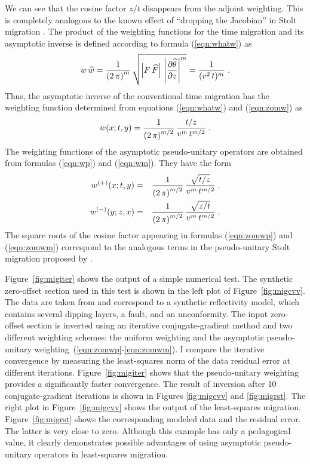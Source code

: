 We can see that the cosine factor $z/t$ disappears from the adjoint
weighting. This is completely analogous to the known effect of
``dropping the Jacobian'' in Stolt migration
\cite[]{Harlan.sep.35.181,Levin.sep.80.513}.  The product of the
weighting functions for the time migration and its asymptotic inverse
is defined according to formula (\ref{eqn:whatw}) as
\begin{equation}
w\,\widehat{w}={1\over{\left(2\,\pi\right)^m}} \, 
{\sqrt{\left|F\,\widehat{F}\right|\,
\left|\partial \widehat{\theta} \over \partial z\right|^m}} =
{1 \over {(v^2\,t)^m}}\;.
\label{eqn:zomww}
\end{equation}
Thus, the asymptotic inverse of the conventional time migration has
the weighting function determined from equations (\ref{eqn:whatw}) and
(\ref{eqn:zomw}) as
\begin{equation}
w(x;t,y) = {1\over{\left(2\,\pi\right)^{m/2}}} \, {{t/z} \over
{v^m\,t^{m/2}}}\;.
\label{eqn:invzomw}
\end{equation}
The weighting functions of the asymptotic pseudo-unitary operators are
obtained from formulas (\ref{eqn:wp}) and (\ref{eqn:wm}). They have the form
 \begin{eqnarray} 
w^{(+)}(x;t,y) & = &
{1\over{\left(2\,\pi\right)^{m/2}}} \, 
{\sqrt{t/z} \over {v^m\,t^{m/2}}}\;.
\label{eqn:zomwp} \\
w^{(-)}(y;z,x) & = & {1\over{\left(2\,\pi\right)^{m/2}}} \, 
{\sqrt{z/t} \over {v^m\,t^{m/2}}}\;.
\label{eqn:zomwm}
\end{eqnarray}
The square roots of the cosine factor appearing in formulas
(\ref{eqn:zomwp}) and (\ref{eqn:zomwm}) correspond to the analogous
terms in the pseudo-unitary Stolt migration proposed by
\cite{Harlan.sep.48.127}.

Figure~\ref{fig:migiter} shows the output of a simple numerical test.
The synthetic zero-offset section used in this test is shown in the
left plot of Figure~\ref{fig:migcvv}. The data are taken from
\cite{Claerbout.bei.95} and correspond to a synthetic reflectivity
model, which contains several dipping layers, a fault, and an
unconformity. The input zero-offset section is inverted using an
iterative conjugate-gradient method and two different weighting
schemes: the uniform weighting and the asymptotic pseudo-unitary
weighting~(\ref{eqn:zomwp}-\ref{eqn:zomwm}). I compare the iterative
convergence by measuring the least-squares norm of the data residual
error at different iterations.  Figure~\ref{fig:migiter} shows that
the pseudo-unitary weighting provides a significantly faster
convergence.  The result of inversion after 10 conjugate-gradient
iterations is shown in Figures \ref{fig:migcvv} and \ref{fig:migrst}.
The right plot in Figure~\ref{fig:migcvv} shows the output of the
least-squares migration. Figure~\ref{fig:migrst} shows the
corresponding modeled data and the residual error. The latter is very
close to zero. Although this example has only a pedagogical value, it
clearly demonstrates possible advantages of using asymptotic
pseudo-unitary operators in least-squares migration.

